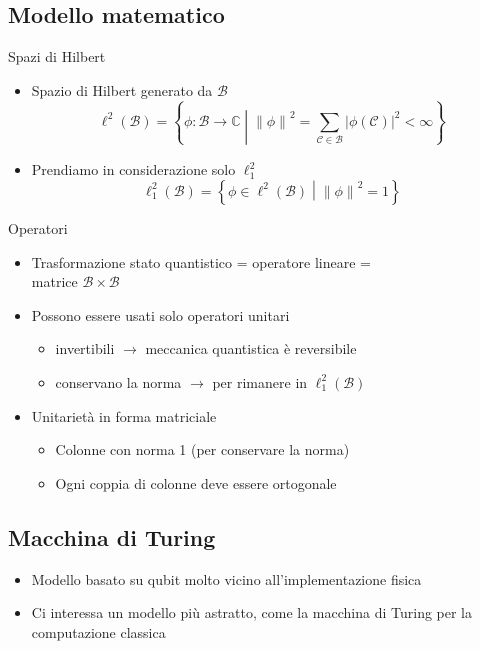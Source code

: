 \documentclass{beamer}
\newcommand{\spacedmiddle}[1]{\mathrel{}\middle#1\mathrel{}}
\newcommand{\hil}{\ell^{2}}
\newcommand{\hiluninorm}{\hil_{1}}
\begin{document}
\subsection{Modello matematico}

\begin{frame}{\subsecname}{Spazi di Hilbert}
	\begin{itemize}
		\item<+-> \alert{Spazio di Hilbert} generato da \( \mathcal{B} \)
		\[ \hil \left ( \mathcal{B} \right ) = \left \{ \phi : \mathcal{B} \rightarrow \mathbb{C} \spacedmiddle | \left \| \phi \right \|^{2} = \sum_{\mathcal{C} \in \mathcal{B}} \left | \phi \left ( \mathcal{C} \right ) \right |^{2} < \infty \right \}\]
		\item<+-> Prendiamo in considerazione solo \(\hiluninorm\)
		\[ \hiluninorm \left ( \mathcal{B} \right ) = \left \{ \phi \in \hil \left ( \mathcal{B} \right ) \spacedmiddle | \left \| \phi \right \|^{2} = 1 \right \}\]
	\end{itemize}
\end{frame}

\begin{frame}{\subsecname}{Operatori}
	\begin{itemize}
		\item<+-> Trasformazione stato quantistico = operatore lineare = \\
		matrice \( \mathcal{B} \times \mathcal{B} \)
		\item<+-> Possono essere usati solo \alert{operatori unitari}
		\begin{itemize}
			\item invertibili \(\rightarrow\) meccanica quantistica è reversibile
			\item conservano la norma \(\rightarrow\) per rimanere in \(\hiluninorm \left ( \mathcal{B} \right )\)
		\end{itemize}
		\item<+-> Unitarietà in forma matriciale
		\begin{itemize}
			\item Colonne con norma 1 (per conservare la norma)
			\item Ogni coppia di colonne deve essere ortogonale
		\end{itemize}
	\end{itemize}
\end{frame}

\subsection{Macchina di Turing}
\begin{frame}{\subsecname}{}
	\begin{itemize}
		\item Modello basato su qubit molto vicino all'implementazione fisica
		\item Ci interessa un modello più astratto, come la macchina di Turing per la computazione classica
	\end{itemize}
\end{frame}
\end{document}
